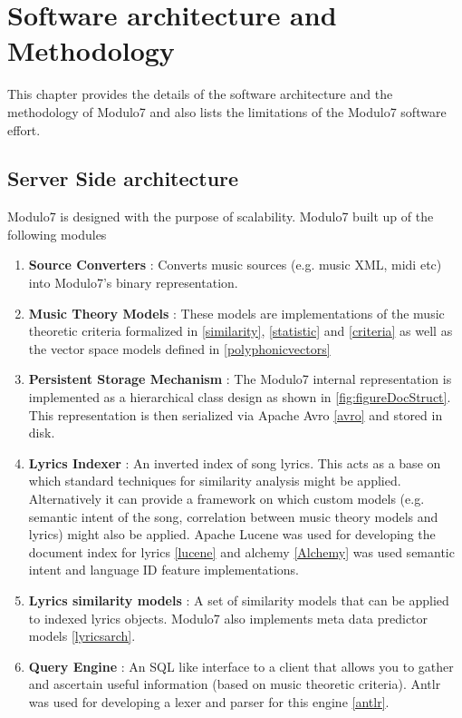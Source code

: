 \chapter{Software architecture and Methodology}
\noindent This chapter provides the details of the software architecture and the methodology of Modulo7 and also lists the limitations of the Modulo7 software effort. 
\section{Server Side architecture}
\noindent Modulo7 is designed with the purpose of scalability. Modulo7 built up of the following modules
\begin{enumerate}
\item \textbf{Source Converters} : Converts music sources (e.g. music XML, midi etc) into Modulo7's binary representation.
\item \textbf{Music Theory Models} : These models are implementations of the music  theoretic criteria formalized in \ref{similarity}, \ref{statistic} and \ref{criteria} as well as the vector space models defined in \ref{polyphonicvectors}
\item \textbf{Persistent Storage Mechanism} : The Modulo7 internal representation is implemented as a hierarchical class design as shown in \ref{fig:figureDocStruct}. This representation is then serialized via Apache Avro \ref{avro} and stored in disk. 
\item \textbf{Lyrics Indexer} : An inverted index of song lyrics. This acts as a base on which standard techniques for similarity analysis might be applied. Alternatively it can provide a framework on which custom models (e.g. semantic intent of the song, correlation between music theory models and lyrics) might also be applied. Apache Lucene was used for developing the document index for lyrics \ref{lucene} and alchemy \ref{Alchemy} was used semantic intent and language ID feature implementations.  
\item \textbf{Lyrics similarity models} : A set of similarity models that can be applied to indexed lyrics objects. Modulo7 also implements meta data predictor models \ref{lyricsarch}. 
\item \textbf{Query Engine} : An SQL like interface to a client that allows you to gather and ascertain useful information (based on music theoretic criteria). Antlr was used for developing a lexer and parser for this engine \ref{antlr}. 
\end{enumerate}

